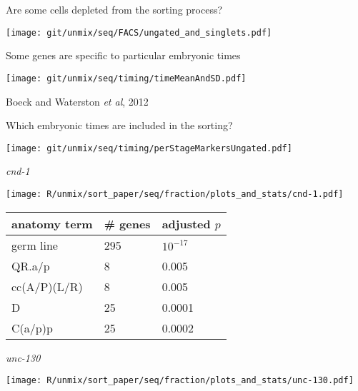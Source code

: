 \documentclass[serif,9pt]{beamer}
\begin{document}
\begin{frame}{Are some cells depleted from the sorting process?}

\texttt{[image: git/unmix/seq/FACS/ungated\_and\_singlets.pdf]}

\end{frame}

\begin{frame}{Some genes are specific to particular embryonic times}

\texttt{[image: git/unmix/seq/timing/timeMeanAndSD.pdf]}

\hfill Boeck and Waterston {\em et al}, 2012

\end{frame}


\begin{frame}{Which embryonic times are included in the sorting?}

\texttt{[image: git/unmix/seq/timing/perStageMarkersUngated.pdf]}

\end{frame}


\begin{frame}{{\em cnd-1}}
\begin{minipage}{0.4\textwidth}
\texttt{[image: R/unmix/sort\_paper/seq/fraction/plots\_and\_stats/cnd-1.pdf]}
\end{minipage}
\begin{minipage}{0.58\textwidth}
\begin{table}[!tbp]\scriptsize
\begin{tabular}{lll}
anatomy term & \# genes & adjusted $p$ \\
\hline
germ line & 295 & $10^{-17}$ \\
QR.a/p & 8 & 0.005 \\
cc(A/P)(L/R) & 8 & 0.005 \\
D & 25 & 0.0001 \\
C(a/p)p & 25 & 0.0002 
\end{tabular}
\end{table}
\end{minipage}

\end{frame}


\begin{frame}{{\em unc-130}}

\texttt{[image: R/unmix/sort\_paper/seq/fraction/plots\_and\_stats/unc-130.pdf]}

\end{frame}
\end{document}
